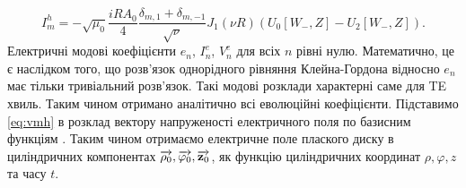 %
%
%
%
\begin{equation} \label{eq:imh}
I_{m}^{h} = - \sqrt{\mu_0} \frac{iR A_0}{4} 
\frac{\delta_{m,1} + \delta_{m,-1}}{\sqrt{\nu}} 
J_1 (\nu R) \left( U_0 [ W_-, Z ] - U_2 [ W_-, Z ] \right).
\end{equation}
%
Електричні модові коефіцієнти $ e_n $, $ I_n^e $, $ V_n^e $ для всіх $ n $
рівні нулю. Математично, це є наслідком того, що розв'язок однорідного рівняння 
Клейна-Гордона відносно $ e_n $ має тільки тривіальний розв'язок. Такі модові
розклади характерні саме для TE хвиль.
%
Таким чином отримано аналітично всі еволюційні коефіцієнти. Підставимо
\eqref{eq:vmh} в розклад вектору напруженості електричного поля по
базисним функціям \cite{imp:Dumin2010}. Таким чином отримаємо електричне 
поле плаского диску в циліндричних компонентах 
$ \overrightarrow{\mathbf \rho_0}, \overrightarrow{\mathbf \varphi_0}, \overrightarrow{\mathbf z_0} $, як функцію циліндричних 
координат $ \rho, \varphi, z $ та часу $ t $.
%
